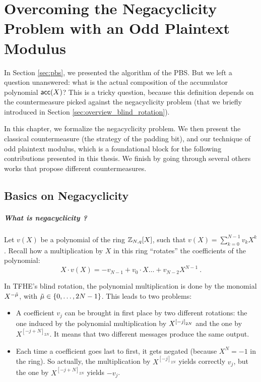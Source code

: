 
\chapter[The Negacyclicity Problem]{Overcoming the Negacyclicity Problem with an Odd Plaintext Modulus}
\label{chap:negacyclicity}


In Section \ref{sec:pbs}, we presented the algorithm of the PBS. But we left a question unanswered: what is the actual composition of the accumulator polynomial $\textsf{acc}(X)$? This is a tricky question, because this definition depends on the countermeasure picked against the negacyclicity problem (that we briefly introduced in Section \ref{sec:overview_blind_rotation}). 


In this chapter, we formalize the negacyclicity problem. We then present the classical countermeasure (the strategy of the padding bit), and our technique of odd plaintext modulus, which is a foundational block for the following contributions presented in this thesis. We finish by going through several others works that propose different countermeasures.


\section{Basics on Negacyclicity}

\paragraph{What is negacyclicity ?}

Let $v(X)$ be a polynomial of the ring $\mathbb{Z}_{N,q}[X]$, such that $v(X) = \sum_{k=0}^{N-1} v_k X^k$. Recall how a multiplication by $X$  in this ring ``rotates'' the coefficients of the polynomial: \[X \cdot v(X) = - v_{N - 1} + v_0 \cdot X \dots + v_{N - 2} X^{N - 1}~.\]

In TFHE's blind rotation, the polynomial multiplication is done by the monomial $X^{-\Tilde{\mu}}$, with $\Tilde{\mu} \in \left \lbrace 0, \dots, 2N - 1 \right \rbrace$. This leads to two problems:

\begin{itemize}
	\item A coefficient $v_j$ can be brought in first place by two different rotations: the one induced by the polynomial multiplication by $X^{\left [ -j \right ]_{2N}}$ and the one by $X^{[-j + N]_{2N}}$. It means that two different messages produce the same output.
	\item Each time a coefficient goes last to first, it gets negated (because $X^N = -1$ in the ring). So actually, the multiplication by $X^{[-j]_{2N}}$ yields correctly $v_j$, but the one by $X^{[-j + N]_{2N}}$ yields $-v_j$.
\end{itemize}


